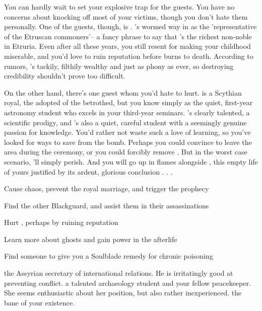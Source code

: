 \documentclass[char]{Kos}
\begin{document}
You can hardly wait to set your explosive trap for the guests. You have no concerns about knocking off most of your victims, though you don't hate them personally. One of the guests, though, is \cMerchant{}. \cMerchant{\They}'s wormed \cMerchant{\their} way in as the 'representative of the Etruscan commoners'-- a fancy phrase to say that \cMerchant{\they}'s the richest non-noble in Etruria. Even after all these years, you still resent \cMerchant{\them} for making your childhood miserable, and you'd love to ruin \cMerchant{\their} reputation before \cMerchant{\they} burns to death. According to rumors, \cMerchant{\they}'s tackily, filthily wealthy and just as phony as ever, so destroying \cMerchant{\their} credibility shouldn't prove too difficult.

On the other hand, there's one guest whom you'd hate to hurt. \cWard{} is a Scythian royal, the adopted \cWard{\sibling} of the betrothed, but you know \cWard{\them} simply as the quiet, first-year astronomy student who excels in your third-year seminars. \cWard{\They}'s clearly talented, a scientific prodigy, and \cWard{\they}'s also a quiet, careful student with a seemingly genuine passion for knowledge. You'd rather not waste such a love of learning, so you've looked for ways to save \cWard{\them} from the bomb. Perhaps you could convince \cWard{\them} to leave the area during the ceremony, or you could forcibly remove \cWard{\them}. But in the worst case scenario, \cWard{\they}'ll simply perish. And you will go up in flames alongside \cWard{\them}, this empty life of yours justified by its ardent, glorious conclusion . . .

\begin{itemz}[Goals]
\item Cause chaos, prevent the royal marriage, and trigger the prophecy
\item Find the other Blackguard, and assist them in their assassinations
\item Hurt \cMerchant{}, perhaps by ruining \cMerchant{\their} reputation
\item Learn more about ghosts and gain power in the afterlife
\item Find someone to give you a Soulblade remedy for chronic poisoning
\end{itemz}

\begin{contacts}
 the Assyrian secretary of international relations. He is irritatingly good at preventing conflict.
\contact{\cArchaeologist{}} a talented archaeology student and your fellow peacekeeper. She seems enthusiastic about her position, but also rather inexperienced.
\contact{\cMerchant{}} the bane of your existence.
\end{contacts}
\end{document}
